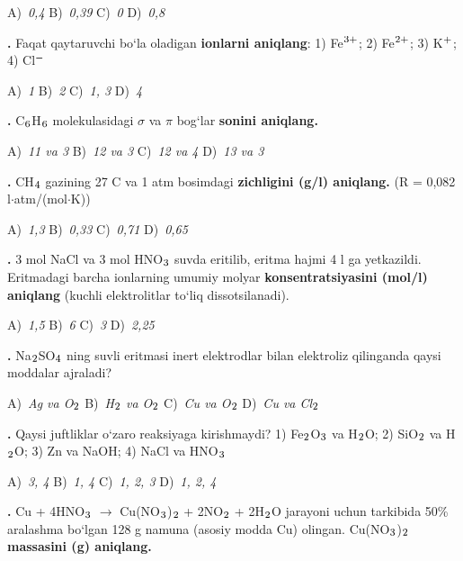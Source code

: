 \documentclass[11pt,a4paper]{article}
\renewcommand{\textsubscript}[1]{\ensuremath{_{\text{\fontsize{8}{8}\selectfont #1}}}}
\renewcommand{\textsuperscript}[1]{\ensuremath{^{\text{\fontsize{8}{8}\selectfont #1}}}}
\newcommand{\qn}[1]{\textbf{\fontsize{11.5}{13}\selectfont #1}}
\newcommand{\qsep}{\par\vspace{1pt}\noindent\rule{0pt}{0.4pt}\par\vspace{5pt}}
\begin{document}
\begin{multicols}{2}
\noindent A)~\textsl{0,4} \hfill B)~\textsl{0,39} \hfill C)~\textsl{0} \hfill D)~\textsl{0,8}\par
\qsep
\noindent\qn{9.} Faqat qaytaruvchi bo`la oladigan \textbf{ionlarni aniqlang}: 1) Fe\textsuperscript{3+}; 2) Fe\textsuperscript{2+}; 3) K\textsuperscript{+}; 4) Cl\textsuperscript{$-$}

\noindent A)~\textsl{1} \hfill B)~\textsl{2} \hfill C)~\textsl{1, 3} \hfill D)~\textsl{4}\par
\qsep
\noindent\qn{10.} C\textsubscript{6}H\textsubscript{6} molekulasidagi $\sigma$ va $\pi$ bog`lar \textbf{sonini aniqlang.}

\noindent A)~\textsl{11 va 3} \hfill B)~\textsl{12 va 3} \hfill C)~\textsl{12 va 4} \hfill D)~\textsl{13 va 3}\par
\qsep
\noindent\qn{11.} CH\textsubscript{4} gazining 27 \textdegree{}C va 1 atm bosimdagi \textbf{zichligini (g/l) aniqlang.} (R = 0,082 l$\cdot$atm/(mol$\cdot$K))

\noindent A)~\textsl{1,3} \hfill B)~\textsl{0,33} \hfill C)~\textsl{0,71} \hfill D)~\textsl{0,65}\par
\qsep
\noindent\qn{12.} 3 mol NaCl va 3 mol HNO\textsubscript{3} suvda eritilib, eritma hajmi 4 l ga yetkazildi. Eritmadagi barcha ionlarning umumiy molyar \textbf{konsentratsiyasini (mol/l) aniqlang} (kuchli elektrolitlar to`liq dissotsilanadi).

\noindent A)~\textsl{1,5} \hfill B)~\textsl{6} \hfill C)~\textsl{3} \hfill D)~\textsl{2,25}\par
\qsep
\noindent\qn{13.} Na\textsubscript{2}SO\textsubscript{4} ning suvli eritmasi inert elektrodlar bilan elektroliz qilinganda qaysi moddalar ajraladi?

\noindent A)~\textsl{Ag va O\textsubscript{2}} \hfill B)~\textsl{H\textsubscript{2} va O\textsubscript{2}} \hfill C)~\textsl{Cu va O\textsubscript{2}} \hfill D)~\textsl{Cu va Cl\textsubscript{2}}\par
\qsep
\noindent\qn{14.} Qaysi juftliklar o`zaro reaksiyaga kirishmaydi? 1) Fe\textsubscript{2}O\textsubscript{3} va H\textsubscript{2}O; 2) SiO\textsubscript{2} va H\textsubscript{2}O; 3) Zn va NaOH; 4) NaCl va HNO\textsubscript{3}

\noindent A)~\textsl{3, 4} \hfill B)~\textsl{1, 4} \hfill C)~\textsl{1, 2, 3} \hfill D)~\textsl{1, 2, 4}\par
\qsep
\noindent\qn{15.} Cu + 4HNO\textsubscript{3} $\to$ Cu(NO\textsubscript{3})\textsubscript{2} + 2NO\textsubscript{2} + 2H\textsubscript{2}O jarayoni uchun tarkibida 50\% aralashma bo`lgan 128 g namuna (asosiy modda Cu) olingan. Cu(NO\textsubscript{3})\textsubscript{2} \textbf{massasini (g) aniqlang.}


\end{multicols}
\end{document}
